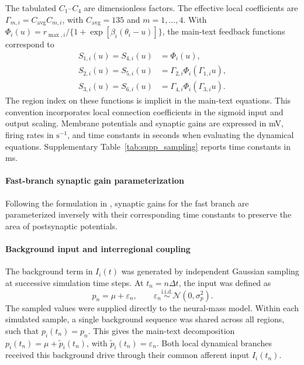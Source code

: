 \documentclass[11pt]{article}
\begin{document}
The tabulated $C_1$--$C_4$ are dimensionless factors. The effective local coefficients are $\Gamma_{m,i}=C_{\mathrm{avg}}C_{m,i}$, with $C_{\mathrm{avg}}=135$ and $m=1,\ldots,4$. With $\Phi_i(u)=r_{\max,i}/\{1+\exp[\beta_i(\theta_i-u)]\}$, the main-text feedback functions correspond to
\[
\begin{aligned}
S_{1,i}(u)=S_{4,i}(u)&=\Phi_i(u),\\
S_{2,i}(u)=S_{5,i}(u)&=\Gamma_{2,i}\Phi_i(\Gamma_{1,i}u),\\
S_{3,i}(u)=S_{6,i}(u)&=\Gamma_{4,i}\Phi_i(\Gamma_{3,i}u).
\end{aligned}
\]
The region index on these functions is implicit in the main-text equations. This convention incorporates local connection coefficients in the sigmoid input and output scaling. Membrane potentials and synaptic gains are expressed in mV, firing rates in $\mathrm{s}^{-1}$, and time constants in seconds when evaluating the dynamical equations. Supplementary Table~\ref{tab:supp_sampling} reports time constants in ms.

\paragraph{Fast-branch synaptic gain parameterization}
Following the formulation in \citet{coroneloliveros2026multifrequency}, synaptic gains for the fast branch are parameterized inversely with their corresponding time constants to preserve the area of postsynaptic potentials.


\paragraph{Background input and interregional coupling}
The background term in $I_i(t)$ was generated by independent Gaussian sampling at successive simulation time steps. At $t_n=n\Delta t$, the input was defined as
\[
p_n=\mu+\varepsilon_n,\qquad
\varepsilon_n\overset{\mathrm{i.i.d.}}{\sim}\mathcal{N}(0,\sigma_p^2).
\]
The sampled values were supplied directly to the neural-mass model. Within each simulated sample, a single background sequence was shared across all regions, such that $p_i(t_n)=p_n$. This gives the main-text decomposition $p_i(t_n)=\mu+\widetilde p_i(t_n)$, with $\widetilde p_i(t_n)=\varepsilon_n$. Both local dynamical branches received this background drive through their common afferent input $I_i(t_n)$.
\end{document}
